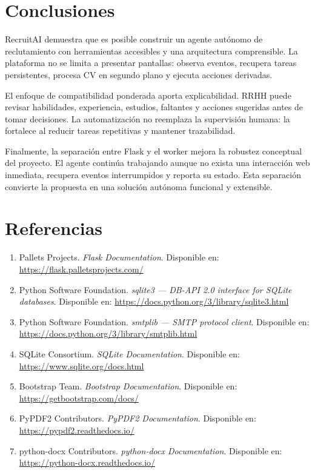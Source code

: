\documentclass[12pt,a4paper]{article}
\newcommand{\projectname}{RecruitAI}
\begin{document}
\section{Conclusiones}

\projectname{} demuestra que es posible construir un agente autónomo de reclutamiento con herramientas accesibles y una arquitectura comprensible. La plataforma no se limita a presentar pantallas: observa eventos, recupera tareas persistentes, procesa CV en segundo plano y ejecuta acciones derivadas.

El enfoque de compatibilidad ponderada aporta explicabilidad. RRHH puede revisar habilidades, experiencia, estudios, faltantes y acciones sugeridas antes de tomar decisiones. La automatización no reemplaza la supervisión humana: la fortalece al reducir tareas repetitivas y mantener trazabilidad.

Finalmente, la separación entre Flask y el worker mejora la robustez conceptual del proyecto. El agente continúa trabajando aunque no exista una interacción web inmediata, recupera eventos interrumpidos y reporta su estado. Esta separación convierte la propuesta en una solución autónoma funcional y extensible.

\section*{Referencias}

\begin{enumerate}[leftmargin=*]
    \item Pallets Projects. \textit{Flask Documentation}. Disponible en: \url{https://flask.palletsprojects.com/}
    \item Python Software Foundation. \textit{sqlite3 --- DB-API 2.0 interface for SQLite databases}. Disponible en: \url{https://docs.python.org/3/library/sqlite3.html}
    \item Python Software Foundation. \textit{smtplib --- SMTP protocol client}. Disponible en: \url{https://docs.python.org/3/library/smtplib.html}
    \item SQLite Consortium. \textit{SQLite Documentation}. Disponible en: \url{https://www.sqlite.org/docs.html}
    \item Bootstrap Team. \textit{Bootstrap Documentation}. Disponible en: \url{https://getbootstrap.com/docs/}
    \item PyPDF2 Contributors. \textit{PyPDF2 Documentation}. Disponible en: \url{https://pypdf2.readthedocs.io/}
    \item python-docx Contributors. \textit{python-docx Documentation}. Disponible en: \url{https://python-docx.readthedocs.io/}
\end{enumerate}
\end{document}

